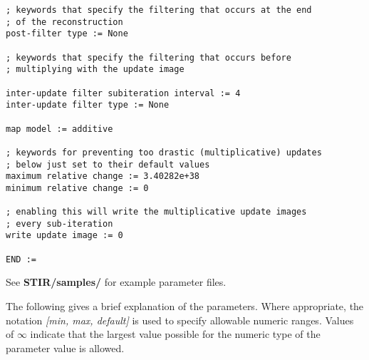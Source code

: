 \documentclass{article}
\begin{document}
\begin{verbatim}
; keywords that specify the filtering that occurs at the end
; of the reconstruction
post-filter type := None

; keywords that specify the filtering that occurs before 
; multiplying with the update image

inter-update filter subiteration interval := 4
inter-update filter type := None

map model := additive

; keywords for preventing too drastic (multiplicative) updates
; below just set to their default values
maximum relative change := 3.40282e+38
minimum relative change := 0

; enabling this will write the multiplicative update images 
; every sub-iteration
write update image := 0

END :=
\end{verbatim}

See \textbf{STIR/samples/} for example parameter files.

The following gives a brief explanation of the parameters. Where 
appropriate, the notation \textit{[min, max, default]} is used to 
specify allowable numeric ranges. Values of \textit{\ensuremath{\infty}} indicate 
that the largest value possible for the numeric type of the parameter 
value is allowed.
\end{document}
